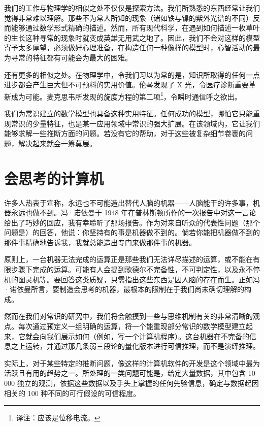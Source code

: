 我们的工作与物理学的相似之处不仅仅是探索方法。我们所熟悉的东西经常让我们觉得非常难以理解。那些不为常人所知的现象（诸如铁与镍的紫外光谱的不同）反而能够通过数学形式精确的描述。然而，所有现代科学，在遇到如何描述一枚草叶的生长这种寻常的现象时就变成英雄无用武之地了。因此，我们不会对这样的模型寄予太多厚望，必须做好心理准备，在构造任何一种像样的模型时，心智活动的最为寻常的特征都有可能会为最大的困难。

还有更多的相似之处。在物理学中，令我们习以为常的是，知识所取得的任何一点进步都会产生巨大但不可预料的实用价值。伦琴发现了 X 光，令医疗诊断重要革新成为可能。麦克思韦所发现的旋度方程的第二项\footnote{译注：应该是位移电流。}，令瞬时通信呼之欲出。

我们为常识建立的数学模型也具备这种实用特征。任何成功的模型，哪怕它只能重现常识的少量特征，也是某一应用领域中常识的强大扩展。在该领域内，它让我们能够求解一些推断方面的问题。若没有它的帮助，对于这些被复杂细节卷裹的问题，解决起来就会一筹莫展。

\section{会思考的计算机}

许多人热衷于宣称，永远也不可能造出替代人脑的机器——人脑能干的许多事，机器永远也做不到。冯·诺依曼于 1948 年在普林斯顿所作的一次报告中对这一言论给出了巧妙的回应，我有幸聆听了那场报告。作为对来自听众的代表性问题（那个问题是）的回答，他说：你坚持有的事是机器做不到的。倘若你能把机器做不到的那件事精确地告诉我，我就总能造出专门来做那件事的机器。

原则上，一台机器无法完成的运算正是那些我们无法详尽描述的运算，或不能在有限步骤下完成的运算。可能有人会提到歌德尔不完备性，不可判定性，以及永不停机的图灵机等。要回答这类质疑，只需指出这些东西是因人脑的存在而生。正如冯·诺依曼所言，要制造会思考的机器，最根本的限制在于我们尚未确切理解的构成。

然而在我们对常识的研究中，我们将会触摸到一些与思维机制有关的非常清晰的观点。每次通过预定义一组明确的运算，将一个能重现部分常识的数学模型建立起来，它就会向我们展示如何（例如，写一个计算机程序）。这台机器在不完备的信息之上运转，并通过那几条弱三段论的量化版本进行可信推理，而不是演绎推理。

实际上，对于某些特定的推断问题，像这样的计算机软件的开发是这个领域中最为活跃且有用的趋势之一。所处理的一类问题可能是，给定大量数据，其中包含 10 000 独立的观测，依据这些数据以及手头上掌握的任何先验信息，确定与数据起因相关的 100 种不同的可行假设的可信程度。

